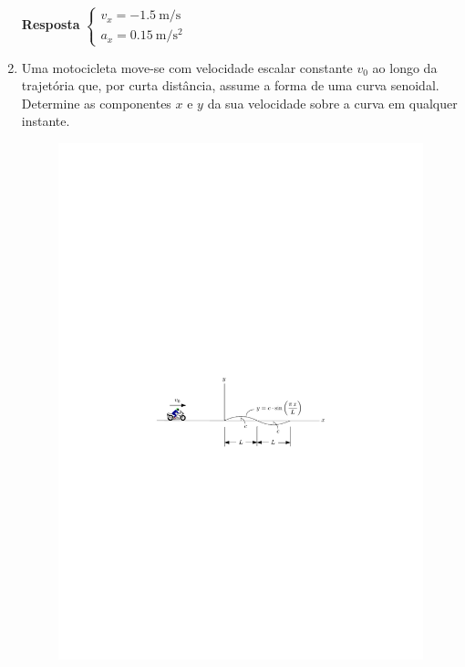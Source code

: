 \documentclass[a4paper,12pt]{article}
\begin{document}
\begin{enumerate}
		\vspace{-4.65cm}
		\textbf{Resposta}
		$
		\begin{cases}
		v_{x}=\SI{-1.5}{\meter/\second}\\
		a_{x}=\SI{0.15}{\meter/\second^{2}}
		\end{cases}
		$
		
		\vspace{3.5cm}
		\item Uma motocicleta move-se com velocidade escalar constante $v_{0}$ ao longo da trajetória que, por curta distância, assume a forma de uma curva senoidal. Determine as componentes $x$ e $y$ da sua velocidade
		sobre a curva em qualquer instante.
		
		\begin{figure}[h!]
			\centering
			\includegraphics[scale=1.2]{images/draw_3}
		\end{figure}
		

\end{enumerate}
\end{document}
